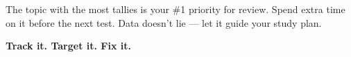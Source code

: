 {\begin{tcolorbox}[
    enhanced,
    colback=funYellowLight,
    colframe=funYellow!60,
    arc=10pt,
    boxrule=1pt,
    left=6mm, right=6mm, top=4mm, bottom=4mm,
]
\vspace{2mm}

The topic with the most tallies is your \#1 priority for review. Spend extra time on it before the next test. Data doesn't lie — let it guide your study plan.
\end{tcolorbox}

\vspace{4mm}

\begin{center}
{\large\bfseries\color{funPurpleDark} \faCrosshairs\hspace{2mm}Track it. Target it. Fix it.\hspace{2mm}\faCrosshairs}
\end{center}

}
\newpage
